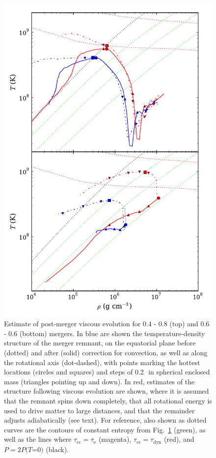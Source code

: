 \begin{figure}
\label{fig:c2_willitexplode}
\end{figure}



\begin{figure}
\centering
\includegraphics[angle=0,width=0.6\columnwidth]{chapter2_zhu+13/figures/PMEvolution.pdf}
\caption{Estimate of post-merger viscous evolution for 0.4 - 0.8 {\Msun} (top) and 0.6 - 0.6 {\Msun} (bottom) mergers.  In blue are shown the temperature-density structure of the merger remnant, on the equatorial plane before (dotted) and after (solid) correction for convection, as well as along the rotational axis (dot-dashed), with points marking the hottest locations (circles and squares) and steps of 0.2\,\Msun\ in spherical enclosed mass (triangles pointing up and down).  In red, estimates of the structure following viscous evolution are shown, where it is assumed that the remnant spins down completely, that all rotational energy is used to drive matter to large distances, and that the remainder adjusts adiabatically (see text).  For reference, also shown as dotted curves are the contours of constant entropy from Fig.~\ref{fig:c2_willitexplode} (green), as well as the lines where $\tau_\mathrm{cc} = \tau_\mathrm{\nu}$ (magenta), $\tau_\mathrm{cc} = \tau_\mathrm{dyn}$ (red), and $P = 2P(T$=$0)$ (black).}
\label{fig:c2_pmevolution}
\end{figure}

